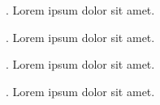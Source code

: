\documentclass{article}
\begin{document}
\begin{pairs}
  \begin{Leftside}
    \beginnumbering
    . Lorem ipsum dolor sit amet.\pend
    \endnumbering
  \end{Leftside}
  \begin{Rightside}
    \beginnumbering
    . Lorem ipsum dolor sit amet.\pend
    \endnumbering
  \end{Rightside}
  \begin{Leftside}
    \beginnumbering
    . Lorem ipsum dolor sit amet.\pend
    \endnumbering
  \end{Leftside}
  \begin{Rightside}
    \beginnumbering
    . Lorem ipsum dolor sit amet.\pend
    \endnumbering
  \end{Rightside}
\end{pairs}
\Columns
\end{document}
